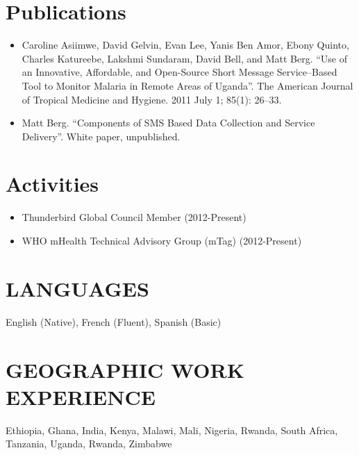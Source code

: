 \documentclass{res}
\begin{document}
\begin{resume}
\section{Publications}
\begin{itemize} \itemsep -2pt
	\item Caroline Asiimwe, David Gelvin, Evan Lee, Yanis Ben Amor, Ebony Quinto, Charles Katureebe, Lakshmi Sundaram, David Bell, and Matt Berg. ``Use of an Innovative, Affordable, and Open-Source Short Message Service–Based Tool to Monitor Malaria in Remote Areas of Uganda''. The American Journal of Tropical Medicine and Hygiene. 2011 July 1; 85(1): 26–33.
        \item Matt Berg. ``Components of SMS Based Data Collection and Service Delivery''.  White paper, unpublished.
\end{itemize}

\section{Activities}
\begin{itemize} \itemsep -2pt
	\item Thunderbird Global Council Member (2012-Present)
        \item WHO mHealth Technical Advisory Group (mTag) (2012-Present)
\end{itemize}

\section{LANGUAGES} 
\vspace{8pt}
English (Native), French (Fluent), Spanish (Basic)

\section{GEOGRAPHIC WORK EXPERIENCE} 
\vspace{8pt}
Ethiopia, Ghana, India, Kenya, Malawi, Mali, Nigeria, Rwanda, South Africa, Tanzania, Uganda, Rwanda, Zimbabwe

\end{resume} 
\end{document}
